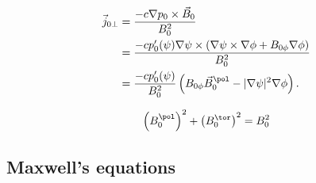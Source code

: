 \iffalse
\usepackage[
  xindy,
  numberedsection,
  toc,
  nonumberlist,
  nopostdot
]{glossaries}
\usepackage{glossary-longbooktabs}
\setglossarystyle{longragged-booktabs}
\makeglossaries
\AfterPreamble{%
  
}
\fi


\begin{align}
  \vec{j}_{0 \perp} &= \frac{-c \nabla p_{0} \times \vec{B}_{0}}{B_{0}^{2}} \\
  &= \frac{-c p_{0}' (\psi) \nabla \psi \times (\nabla \psi \times \nabla \phi + B_{0 \phi} \nabla \phi)}{B_{0}^{2}} \nonumber \\
  &= \frac{-c p_{0}' (\psi)}{B_{0}^{2}} \left( B_{0 \phi} \vec{B}_{0}^{\pol} - \lvert \nabla \psi \rvert^{2} \nabla \phi \right).
\end{align}

\begin{gather}
  \left( B_{0}^{\pol} \right)^{2} + \left( B_{0}^{\tor} \right)^{2} = B_{0}^{2}
\end{gather}

\subsection{Maxwell's equations}

